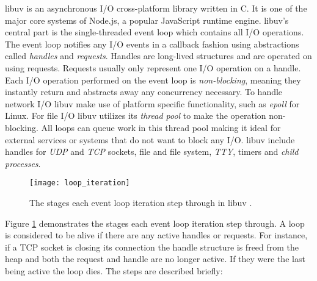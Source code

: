 libuv is an asynchronous I/O cross-platform library written in C. It is one of
the major core systems of Node.js, a popular JavaScript runtime engine. libuv's
central part is the single-threaded event loop which contains all I/O
operations. The event loop notifies any I/O events in a callback fashion using
abstractions called \textit{handles} and \textit{requests}. Handles are
long-lived structures and are operated on using requests. Requests usually only
represent one I/O operation on a handle. Each I/O operation performed on the
event loop is \textit{non-blocking}, meaning they instantly return and
abstracts away any concurrency necessary. To handle network I/O libuv make use
of platform specific functionality, such as \textit{epoll} for Linux. For file
I/O libuv utilizes its \textit{thread pool} to make the operation non-blocking.
All loops can queue work in this thread pool making it ideal for external
services or systems that do not want to block any I/O. libuv include handles
for \textit{UDP} and \textit{TCP} sockets, file and file system, \textit{TTY},
timers and \textit{child processes}. \cite{libuv-docs}

\begin{figure}[h]
  \texttt{[image: loop\_iteration]}
  \centering
  \caption[libuv event loop]{The stages each event loop iteration step through
  in libuv \cite{github2017libuv-loop_iteration}.}
  \label{fig:loop_iteration}
\end{figure}

Figure \ref{fig:loop_iteration} demonstrates the stages each event loop
iteration step through. A loop is considered to be alive if there are any
active handles or requests. For instance, if a TCP socket is closing its
connection the handle structure is freed from the heap and both the request and
handle are no longer active. If they were the last being active the loop dies.
The steps are described briefly: \cite{libuv-docs}

